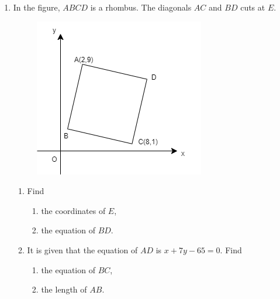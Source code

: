 \documentclass[11pt]{article}
\begin{document}
\begin{enumerate}
            \hrulefill
            
            \hrulefill
            
            \hrulefill

        \pagebreak
        \item In the figure, $ABCD$ is a rhombus. The diagonals $AC$ and $BD$ cuts at $E$.\begin{figure}[H]
            \centering
            \includegraphics[scale=0.6]{f4finalq4.png}
        \end{figure}\begin{enumerate}
            \item Find\begin{enumerate}
                \item the coordinates of $E$,
                \item the equation of $BD$.
            \end{enumerate}
            \item It is given that the equation of $AD$ is $x+7y-65=0$. Find\begin{enumerate}
                \item the equation of $BC$,
                \item the length of $AB$.
            \end{enumerate}
        \end{enumerate}

            \hrulefill
                    
            \hrulefill

            \hrulefill
            
            \hrulefill
        
            \hrulefill
            
            \hrulefill
                

\end{enumerate}
\end{document}

